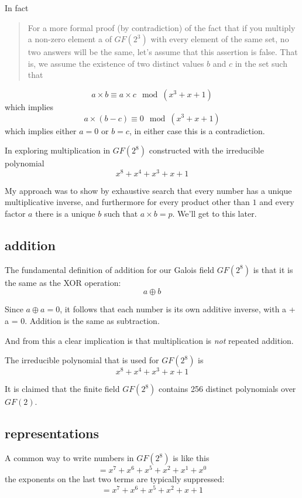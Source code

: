 \documentclass[11pt, oneside]{article}
\begin{document}
In fact

\begin{quote}For a more formal proof (by contradiction) of the fact that if you multiply a non-zero element a of $GF(2^3)$ with every element of the same set, no two answers will be the same, let's assume that this assertion is false. That is, we assume the existence of two distinct values $b$ and $c$ in the set such that \end{quote}

\[ a \times b \equiv a \times c \mod (x^3 + x + 1) \]
which implies
\[ a \times (b - c) \equiv 0 \mod (x^3 + x + 1) \]
which implies either $a = 0$ or $b = c$, in either case this is a contradiction.

In exploring multiplication in $GF(2^8)$ constructed with the irreducible polynomial
\[ x^8 + x^4 + x^3 + x + 1 \]

My approach was to show by exhaustive search that every number has a unique multiplicative inverse, and furthermore for every product other than $1$ and every factor $a$ there is a unique $b$ such that $a \times b = p$.  We'll get to this later.

\subsection*{addition}

The fundamental definition of addition for our Galois field $GF(2^8)$  is that it is the same as the XOR operation:
\[ a \oplus b \]

Since $a \oplus a = 0$, it follows that each number is its own additive inverse, with a + a = 0.  Addition is the same as subtraction.  

And from this a clear implication is that multiplication is \emph{not} repeated addition.

The irreducible polynomial that is used for $GF(2^8)$ is
\[ x^8 + x^4 + x^3 + x + 1 \]

It is claimed that the finite field $GF(2^8)$ contains 256 distinct polynomials over $GF(2)$.

\subsection*{representations}

A common way to write numbers in $GF(2^8)$ is like this
\[ = x^7 + x^6 + x^5 + x^2 + x^1 + x^0 \]
the exponents on the last two terms are typically suppressed:
\[ =  x^7 + x^6 + x^5 + x^2 + x + 1 \]
\end{document}
